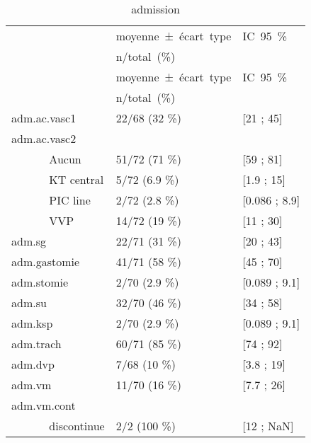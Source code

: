 \documentclass[]{article}
\begin{document}
\begin{longtable}{lll}
  \toprule
  
                                                &\mbox{moyenne ± écart type}&\mbox{IC 95 \%}\\
                                                &\mbox{n/total (\%)}&\\
                                                \midrule
                                                \endfirsthead
                                                \midrule
                                                &\mbox{moyenne ± écart type}&\mbox{IC 95 \%}\\
                                                &\mbox{n/total (\%)}&\\
                                                \midrule
                                                \endhead
                                                \bottomrule
                                                \endfoot
                                                \bottomrule
                                                \caption{admission}
                                                \label{tabdadmission}
                                                \endlastfoot
                                                adm.ac.vasc1 & 22/68 (32 \%) &  [21 ; 45] \\ 
  adm.ac.vasc2 &   &   \\ 
  ~~~~~~ Aucun & 51/72 (71 \%) &  [59 ; 81] \\ 
  ~~~~~~ KT central & 5/72 (6.9 \%) &  [1.9 ; 15] \\ 
  ~~~~~~ PIC line & 2/72 (2.8 \%) &  [0.086 ; 8.9] \\ 
  ~~~~~~ VVP & 14/72 (19 \%) &  [11 ; 30] \\ 
  adm.sg & 22/71 (31 \%) &  [20 ; 43] \\ 
  adm.gastomie & 41/71 (58 \%) &  [45 ; 70] \\ 
  adm.stomie & 2/70 (2.9 \%) &  [0.089 ; 9.1] \\ 
  adm.su & 32/70 (46 \%) &  [34 ; 58] \\ 
  adm.ksp & 2/70 (2.9 \%) &  [0.089 ; 9.1] \\ 
  adm.trach & 60/71 (85 \%) &  [74 ; 92] \\ 
  adm.dvp & 7/68 (10 \%) &  [3.8 ; 19] \\ 
  adm.vm & 11/70 (16 \%) &  [7.7 ; 26] \\ 
  adm.vm.cont &   &   \\ 
  ~~~~~~ discontinue & 2/2 (100 \%) &  [12 ; NaN] \\ 

\end{longtable}
\end{document}
